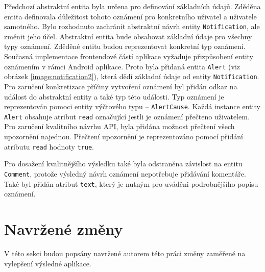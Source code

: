         Předchozí abstraktní entita byla určena pro definování základních údajů. Zděděna entita definovala důležitost tohoto oznámení pro konkretního uživatel a uživatele samotného. Bylo rozhodnuto zachránit abstraktní návrh entity \verb|Notification|, ale změnit jeho účel. Abstraktní entita bude obsahovat základní údaje pro všechny typy oznámení. Zděděné entitu budou reprezentovat konkretní typ oznámení.
        Současná implementace frontendové částí aplikace vyžaduje přizpůsobení entity oznámením v rámci Android aplikace. Proto byla přidaná entita \verb|Alert| (viz obrázek \ref{image:notification2}), která dědí základní údaje od entity \verb|Notification|. Pro zaručení konkretizace příčiny vytvoření oznámení byl přidán odkaz na událost do abstraktní entity a také typ této události. Typ oznámení je reprezentován pomoci entity výčtového typu -- \verb|AlertCause|. 
        Každá instance entity \verb|Alert| obsahuje atribut \verb|read| označující jestli je oznámení přečteno uživatelem. Pro zaručení kvalitního návrhu API, byla přidána možnost přečtení všech upozornění najednou. Přečtení upozornění je reprezentováno pomocí přidání atributu \verb|read| hodnoty \verb|true|.
        
        Pro dosažení kvalitnějšího výsledku také byla odstraněna závislost na entitu \verb|Comment|, protože výsledný návrh oznámení nepotřebuje přidávání komentáře. Také byl přidán atribut \verb|text|, který je nutným pro uváděni podrobnějšího popisu oznámení.
            
\section{Navržené změny}
    V této sekci budou popsány navržené autorem této práci změny zaměřené na vylepšení výsledné aplikace.
    
